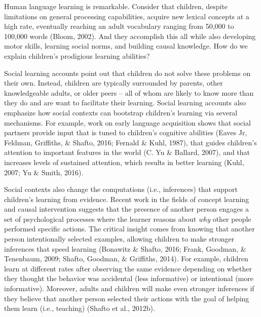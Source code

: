 \documentclass[oneside]{report}
\begin{document}
Human language learning is remarkable. Consider that children, despite
limitations on general processing capabilities, acquire new lexical
concepts at a high rate, eventually reaching an adult vocabulary ranging
from 50,000 to 100,000 words (Bloom, 2002). And they accomplish this all
while also developing motor skills, learning social norms, and building
causal knowledge. How do we explain children's prodigious learning
abilities?

Social learning accounts point out that children do not solve these
problems on their own. Instead, children are typically surrounded by
parents, other knowledgeable adults, or older peers -- all of whom are
likely to know more than they do and are want to facilitate their
learning. Social learning accounts also emphasize how social contexts
can bootstrap children's learning via several mechanisms. For example,
work on early language acquisition shows that social partners provide
input that is tuned to children's cognitive abilities (Eaves Jr,
Feldman, Griffiths, \& Shafto, 2016; Fernald \& Kuhl, 1987), that guides
children's attention to important features in the world (C. Yu \&
Ballard, 2007), and that increases levels of sustained attention, which
results in better learning (Kuhl, 2007; Yu \& Smith, 2016).

Social contexts also change the computations (i.e., inferences) that
support children's learning from evidence. Recent work in the fields of
concept learning and causal intervention suggests that the presence of
another person engages a set of psychological processes where the
learner reasons about \emph{why} other people performed specific
actions. The critical insight comes from knowing that another person
intentionally selected examples, allowing children to make stronger
inferences that speed learning (Bonawitz \& Shafto, 2016; Frank,
Goodman, \& Tenenbaum, 2009; Shafto, Goodman, \& Griffiths, 2014). For
example, children learn at different rates after observing the same
evidence depending on whether they thought the behavior was accidental
(less informative) or intentional (more informative). Moreover, adults
and children will make even stronger inferences if they believe that
another person selected their actions with the goal of helping them
learn (i.e., teaching) (Shafto et al., 2012b).
\end{document}
